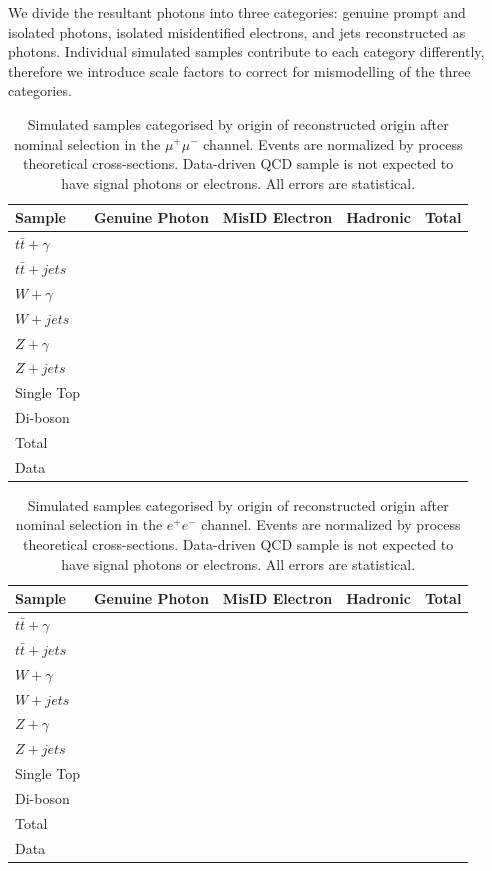 We divide the resultant photons into three categories: genuine prompt and isolated photons, isolated misidentified electrons, and jets reconstructed as photons. Individual simulated samples contribute to each category differently, therefore we introduce scale factors to correct for mismodelling of the three categories. 

\begin{table}
\begin{center}
\begin{tabular}{l|ccc|c}
\hline
	\textbf{Sample} & \textbf{Genuine Photon} & \textbf{MisID Electron} & \textbf{Hadronic} & \textbf{Total} \\
\hline
	$t\bar{t}+\gamma$ & & & & \\
	$t\bar{t}+jets$ & & & & \\
	$W+\gamma$ &  & & & \\
	$W+jets$ & & & & \\
	$Z+\gamma$ & & & & \\
	$Z+jets$ &  &  &  & \\
	Single Top &  & & & \\
	Di-boson  & & & & \\
\hline
	Total & & & & \\
	Data & & & & \\
\hline	
\end{tabular}
\end{center}
\caption{Simulated samples categorised by origin of reconstructed origin after nominal selection in the $\mu^+\mu^-$ channel. Events are normalized by process theoretical cross-sections. Data-driven QCD sample is not expected to have signal photons or electrons. All errors are statistical.}
\label{tab-SigPhotonsMuMu}
\end{table}	

\begin{table}
\begin{center}
\begin{tabular}{l|ccc|c}
\hline
	\textbf{Sample} & \textbf{Genuine Photon} & \textbf{MisID Electron} & \textbf{Hadronic} & \textbf{Total} \\
\hline
	$t\bar{t}+\gamma$ & & & & \\
	$t\bar{t}+jets$ & & & & \\
	$W+\gamma$ &  & & & \\
	$W+jets$ & & & & \\
	$Z+\gamma$ & & & & \\
	$Z+jets$ &  &  &  & \\
	Single Top &  & & & \\
	Di-boson  & & & & \\
\hline
	Total & & & & \\
	Data & & & & \\
\hline	
\end{tabular}
\end{center}
\caption{Simulated samples categorised by origin of reconstructed origin after nominal selection in the $e^+e^-$ channel. Events are normalized by process theoretical cross-sections. Data-driven QCD sample is not expected to have signal photons or electrons. All errors are statistical.}
\label{tab-SigPhotonsEE}
\end{table}	


